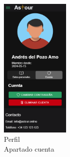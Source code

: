 \begin{figure}[H]
\begin{minipage}{0.45\textwidth}
		\includegraphics[width=0.3\textwidth]{7-Construccion/Manuales/mobile/editar cuenta.png}
		\caption{Perfil \\ Apartado cuenta}
		\label{fig:areaPersonal-cuenta-movil}
	\end{minipage}
\end{figure}

